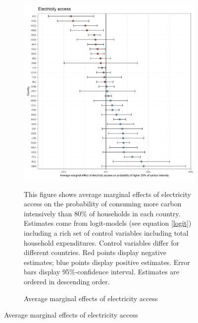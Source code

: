 \begin{figure}[ht!]\ContinuedFloat
   \centering
   \begin{subfigure}[b]{\textwidth}
   \centering
   \caption{Average marginal effects of electricity access} \label{fig:Logit_ME_electricity}
   \includegraphics{1_Figures/Analysis_Logit_Models_Marginal_Effects/Average_Marginal_Effects_affected_upper_80_electricity.access_2017.jpg}
   \begin{subcaption2}
     This figure shows average marginal effects of electricity access on the probability of consuming more carbon intensively than 80\% of households in each country. Estimates come from logit-models (see equation \ref{logit}) including a rich set of control variables including total household expenditures. Control variables differ for different countries. Red points display negative estimates; blue points display positive estimates. Error bars display 95\%-confidence interval. Estimates are ordered in descending order.
   \end{subcaption2}
   \end{subfigure}
 \end{figure}
 \clearpage

